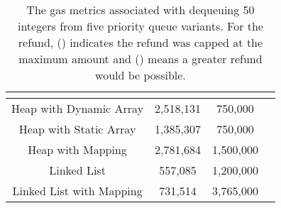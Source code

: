

\begin{table}[t]
\setlength{\tabcolsep}{0.2\tabcolsep}%
\centering
\begin{tabular}{|c|c|c|l|}

\multicolumn{1}{c}{} & \headrow{\footnotesize Gas Costs (\texttt{gasUsed})} & \headrow{\footnotesize Refund (Manual)} & \headrow{\footnotesize Full Refund?} \\ \hline

Heap with Dynamic Array       	& 2,518,131          & 750,000     &\full                  \\ \hline
Heap with Static Array          	& 1,385,307                             & 750,000      &\full                \\ \hline
Heap with Mapping 			& 2,781,684                            & 1,500,000    &\full                 \\ \hline
Linked List                     		& 557,085               	           & 1,200,000      &\full                \\ \hline
Linked List with Mapping      	& 731,514              	     	  &  3,765,000      &\full                 \\ \hline

\end{tabular}
\caption{The gas metrics associated with dequeuing 50 integers from five priority queue variants. For the refund, (\full) indicates the  refund was capped at the maximum amount and (\prt) means a greater refund would be possible.
\label{tab:PQUnitTests}}
\end{table}


